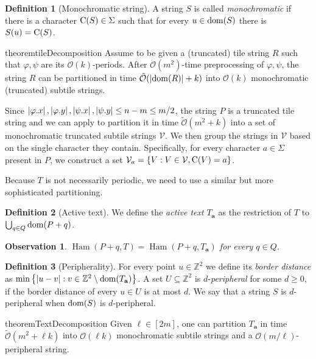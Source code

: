 \documentclass[11pt, letterpaper]{article}
\theoremstyle{plain}
\newtheorem{observation}{Observation}
\theoremstyle{definition}
\newtheorem{definition}{Definition}
\theoremstyle{remark}
\newcommand{\Z}{\mathbb{Z}}
\renewcommand{\O}{\mathcal{O}}
\newcommand{\tO}{\tilde{\mathcal{O}}}
\newcommand{\V}{\mathcal{V}}
\renewcommand{\phi}{\varphi}
\newcommand{\set}[1]{\left\lbrace #1 \right\rbrace}
\DeclareMathOperator*{\Ham}{Ham}
\newcommand{\absolute}[1]{\left\lvert#1\right\rvert}
\begin{document}
\begin{definition}[Monochromatic string]
A string $S$ is called \emph{monochromatic} if there is a character $\operatorname*{C}(S) \in \Sigma$ such that for every $u \in \operatorname*{dom}(S)$ there is $S(u) = \operatorname*{C}(S)$.  
\end{definition}

\begin{restatable*}{theorem}{tileDecomposition}\label{tile_decomposition}
Assume to be given a (truncated) tile string $R$ such that $\phi, \psi$ are its $\O(k)$-periods. After $\O(m^2)$-time preprocessing of $\phi, \psi$, the string $R$ can be partitioned in time $\tO(\absolute{\d{R}} + k)$ into $\O(k)$ monochromatic (truncated) subtile strings.
\end{restatable*}

Since $\absolute{\x{\phi}}, \absolute{\y{\phi}}, \absolute{\x{\psi}}, \absolute{\y{\psi}} \le n - m \le m / 2$, the string $P$ is a truncated tile string and we can apply  to partition it in time $\tO(m^2 + k)$ into a set of monochromatic truncated subtile strings $\V$. We then group the strings in $\V$ based on the single character they contain. Specifically, for every character $a \in \Sigma$ present in $P$, we construct a set $\V_a = \set{V : V \in \V, \getchar{V} = a}$.

Because $T$ is not necessarily periodic, we need to use a similar but more sophisticated partitioning.

\newcommand{\Ta}{T_\mathbf{a}}
\begin{definition}[Active text]
We define the \emph{active text} $\Ta$ as the restriction of $T$ to $\bigcup_{q \in Q} \operatorname*{dom}(P + q)$. 
\end{definition}

\begin{observation}\label{obs:active_text}
$\Ham(P + q, T) = \Ham(P + q, \Ta)$ for every $q \in Q$.
\end{observation}

\begin{definition}[Peripherality]
For every point $u \in \Z^2$ we define its \emph{border distance} as $\min\set{\absolute{u - v} : v \in \Z^2 \setminus \d{\Ta}}$. A set $U \subseteq \Z^2$ is $d$-\emph{peripheral} for some $d \ge 0$, if the border distance of every $u \in U$ is at most $d$. We say that a string $S$ is $d$-peripheral when $\operatorname*{dom}(S)$ is $d$-peripheral.
\end{definition}

\begin{restatable*}{theorem}{TextDecomposition}\label{text_decomposition}
Given $\ell \in [2m]$, one can partition $\Ta$ in time $\tO(m^2 + \ell k)$ into $\O(\ell k)$ monochromatic subtile strings and a $\O(m / \ell)$-peripheral string.
\end{restatable*}
\end{document}
